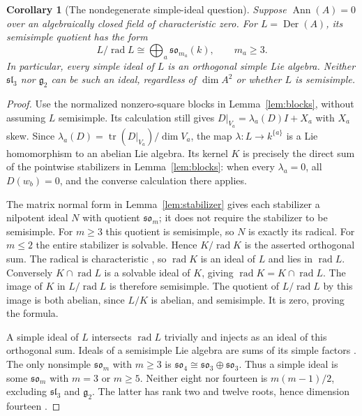 \documentclass[11pt]{article}
\newtheorem{corollary}[theorem]{Corollary}
\DeclareMathOperator{\Der}{Der}
\DeclareMathOperator{\Ann}{Ann}
\DeclareMathOperator{\tr}{tr}
\DeclareMathOperator{\rad}{rad}
\newcommand{\so}{\mathfrak{so}}
\newcommand{\slie}{\mathfrak{sl}}
\begin{document}
\begin{corollary}[The nondegenerate simple-ideal question]\label{cor:quotient}
Suppose $\Ann(A)=0$ over an algebraically closed field of characteristic
zero. For $L=\Der(A)$, its semisimple quotient has the form
\[
 L/\rad L\cong\bigoplus_a\so_{m_a}(k),\qquad m_a\ge3.
\]
In particular, every simple ideal of $L$ is an orthogonal simple Lie
algebra. Neither $\slie_3$ nor $\mathfrak g_2$ can be such an ideal,
regardless of $\dim A^2$ or whether $L$ is semisimple.
\end{corollary}
\begin{proof}
Use the normalized nonzero-square blocks in Lemma~\ref{lem:blocks},
without assuming $L$ semisimple. Its calculation still gives
$D|_{V_a}=\lambda_a(D)I+X_a$ with $X_a$ skew. Since
$\lambda_a(D)=\tr(D|_{V_a})/\dim V_a$, the map
$\lambda:L\to k^{\{a\}}$ is a Lie homomorphism to an abelian Lie algebra.
Its kernel $K$ is precisely the direct sum of the pointwise stabilizers
in Lemma~\ref{lem:blocks}: when every $\lambda_a=0$, all $D(w_b)=0$,
and the converse calculation there applies.

The matrix normal form in Lemma~\ref{lem:stabilizer} gives each stabilizer
a nilpotent ideal $N$ with quotient $\so_m$; it does not require the
stabilizer to be semisimple. For $m\ge3$ this quotient is semisimple,
so $N$ is exactly its radical. For $m\le2$ the entire stabilizer is
solvable. Hence $K/\rad K$ is the asserted orthogonal sum.
The radical is characteristic \cite[Chapter~I, Definition~3.6]{lag},
so $\rad K$ is an ideal of $L$ and lies in $\rad L$.
Conversely $K\cap\rad L$ is a solvable ideal of $K$, giving
$\rad K=K\cap\rad L$. The image of $K$ in $L/\rad L$ is therefore semisimple.
The quotient of $L/\rad L$ by this image is both abelian, since
$L/K$ is abelian, and semisimple. It is zero, proving the formula.

A simple ideal of $L$ intersects $\rad L$ trivially and injects as an
ideal of this orthogonal sum. Ideals of a semisimple Lie algebra are sums
of its simple factors \cite[Chapter~I, Theorem~4.17]{lag}.
The only nonsimple $\so_m$ with $m\ge3$ is
$\so_4\cong\so_3\oplus\so_3$. Thus a simple ideal is some
$\so_m$ with $m=3$ or $m\ge5$.
Neither eight nor fourteen is $m(m-1)/2$, excluding $\slie_3$ and
$\mathfrak g_2$. The latter has rank two and twelve roots, hence dimension
fourteen \cite[Chapter~I, \S7 and Theorem~8.31]{lag}.
\end{proof}
\end{document}
